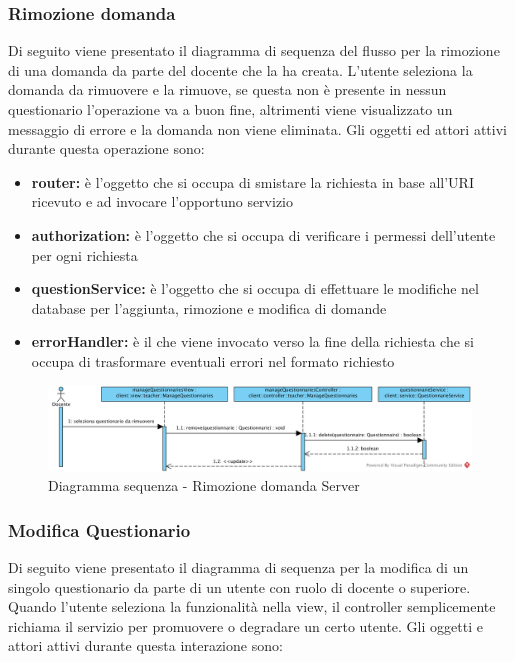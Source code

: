 \documentclass[12pt,a4paper]{article}
\begin{document}
\newpage
\subsubsection{Rimozione domanda}
Di seguito viene presentato il diagramma di sequenza del flusso per la rimozione di una domanda da parte del docente che la ha creata. L'utente seleziona la domanda da rimuovere e la rimuove, se questa non è presente in nessun questionario l'operazione va a buon fine, altrimenti viene visualizzato un messaggio di errore e la domanda non viene eliminata. Gli oggetti ed attori attivi durante questa operazione sono:

\begin{itemize}
	\item \textbf{router:} è l'oggetto che si occupa di smistare la richiesta in base all’URI ricevuto e ad invocare l’opportuno servizio
	\item \textbf{authorization:} è l'oggetto che si occupa di verificare i permessi dell'utente per ogni richiesta	
	\item \textbf{questionService:} è l'oggetto che si occupa di effettuare le modifiche nel database per l'aggiunta, rimozione e modifica di domande
	\item \textbf{errorHandler:} è il  che viene invocato verso la fine della richiesta che si occupa di trasformare eventuali errori nel formato  richiesto
\end{itemize}

\begin{center}
	\begin{figure}[H]
		\centering \includegraphics[max width=\myheight, angle=90]{../img/diagrammiSequenza/rimozioneQuestionarioClient.png}
		\caption{Diagramma sequenza - Rimozione domanda Server}
	\end{figure}
\end{center}

\newpage
\subsubsection{Modifica Questionario}
Di seguito viene presentato il diagramma di sequenza per la modifica di un singolo questionario da parte di un utente con ruolo di docente o superiore. Quando l'utente seleziona la funzionalità nella view, il controller semplicemente richiama il servizio per promuovere o degradare un certo utente. Gli oggetti e attori attivi durante questa interazione sono:
\end{document}
